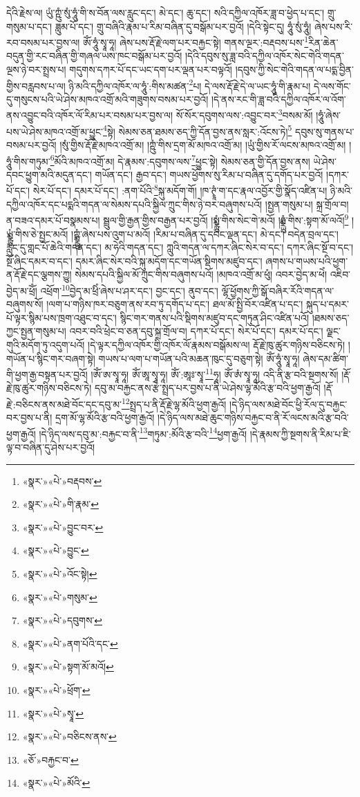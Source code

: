 དེའི་རྗེས་ལ། ཡུཾ་ཀྵུཾ་སུཾ་ཧཱུཾ་གི་ས་བོན་ལས་རླུང་དང་། མེ་དང་། ཆུ་དང་། སའི་དཀྱིལ་འཁོར་ཟླ་བ་ཕྱེད་པ་དང་། གྲུ་གསུམ་པ་དང་། ཟླུམ་པོ་དང་། གྲུ་བཞིའི་རྣམ་པ་རིམ་བཞིན་དུ་བསྒོམ་པར་བྱའོ། །དེའི་སྟེང་དུ། ཧཱུཾ་སུཾ་ཧཱུཾ། ཞེས་པས་རི་རབ་བསམ་པར་བྱས་ལ། ཨོཾ་ཧཱུཾ་སྭཱ་ཧཱ། ཞེས་པས་རྡོ་རྗེ་ལག་པར་བརྐྱང་སྟེ། གནས་ལྔར་:བརྡབས་པས་\footnote{«སྣར་»«པེ་»བརྡབས་}རིན་ཆེན་བདུན་གྱི་རང་བཞིན་གྱི་གཞལ་ཡས་ཁང་བསྒོམ་པར་བྱའོ། །དེའི་དབུས་སུ་ཟླ་བའི་དཀྱིལ་འཁོར་སེང་གེའི་གདན་ལྔས་ཉེ་བར་སྤྲས་པ། གདུགས་དཀར་པོ་དང་ཡང་དག་པར་ལྡན་པར་བལྟའོ། །དབུས་ཀྱི་སེང་གེའི་གདན་ལ་པདྨ་བྱིན་གྱིས་བརླབས་པ་ལ། ཉི་མའི་དཀྱིལ་འཁོར་ལ་ཧཱུཾ་:གིས་མཚན་\footnote{«སྣར་»«པེ་»གི་རྣམ་}པ། དེ་ལས་རྡོ་རྗེ་དེ་ལ་ཡང་ཧཱུཾ་གི་རྣམ་པ། དེ་ལས་གོང་དུ་གསུངས་པའི་ཡེ་ཤེས་མཁའ་འགྲོ་མའི་གཟུགས་བསམ་པར་བྱའོ། །དེ་ནས་རང་གི་ཟླ་བའི་དཀྱིལ་འཁོར་ལ་འོག་ནས་འབྱུང་བའི་འཁོར་ལོ་རིམ་པར་བསམ་པར་བྱས་ལ། སོ་སོར་དབུགས་ལས་:འབྱུང་བར་\footnote{«སྣར་»«པེ་»བྱུང་བར་}བསམ་མོ། །ཧཱུཾ་ཞེས་པས་ཡེ་ཤེས་མཁའ་འགྲོ་མ་ཕྱུང་\footnote{«སྣར་»«པེ་»བྱུང་}སྟེ། སེམས་ཅན་ཐམས་ཅད་ཀྱི་དོན་བྱས་ནས་སླར་:འོངས་ཏེ།\footnote{«སྣར་»«པེ་»འོང་སྟེ།} དབུས་སུ་གནས་པ་བསམ་པར་བྱའོ། །སུཾ་གྱིས་རྡོ་རྗེ་མཁའ་འགྲོ་མ། །ཀྵུཾ་གིས་དྲག་མོ་མཁའ་འགྲོ་མ། །ཡུཾ་གྱིས་རོ་ལངས་མཁའ་འགྲོ་མ། །ཧཱུཾ་གིས་གཏུམ་\footnote{«སྣར་»«པེ་»གསུམ་}མོའི་མཁའ་འགྲོ་མ། དེ་རྣམས་:དབུགས་ལས་\footnote{«སྣར་»«པེ་»དབུགས་}ཕྱུང་སྟེ། སེམས་ཅན་གྱི་དོན་བྱས་ནས། ཡེ་ཤེས་དབང་ཕྱུག་མའི་མདུན་དང་། གཡོན་དང་། རྒྱབ་དང་། གཡས་ཕྱོགས་སུ་རིམ་པ་བཞིན་དུ་དགོད་པར་བྱའོ། །དཀར་པོ་དང་། སེར་པོ་དང་། དམར་པོ་དང་། :ནག་པོའི་\footnote{«སྣར་»«པེ་»ནག་པོའི་དང་}སྐུ་མདོག་གོ། །ཁ་ཊྭཱཾ་ག་དང་རྣལ་འབྱོར་གྱི་སྣོད་འཛིན་པ། ཉི་མའི་དཀྱིལ་འཁོར་དང་པདྨའི་གདན་ལ་སེམས་དཔའི་སྐྱིལ་ཀྲུང་གིས་ཉེ་བར་བཞུགས་པའོ། །སྤྱན་གསུམ་པ། སྐྲ་གྲོལ་བ། ན་བཟའ་དམར་པོ་བསྣམས་པ། སྦྲུལ་གྱི་རྒྱན་གྱིས་བརྒྱན་པར་བྱའོ། །སྨྼྻུཾ་གིས་སེང་གེ་མའོ། །ཧྨྼྻུཾ་གིས་:སྟག་མོ་ལའོ།\footnote{«སྣར་»«པེ་»སྟག་མོ་མའོ།} །ཡྨྼྻུཾ་གིས་ཅེ་སྤྱང་མའོ། །ཀྵྨྼྻུཾ་ཞེས་པས་འུག་པ་མའོ། །རིམ་པ་བཞིན་དུ་དབང་ལྡན་དང་། མེ་དང་། བདེན་བྲལ་དང་། རླུང་དུ་གླང་པོ་ཆེའི་གདན་དང་། མ་ཧེའི་གདན་དང་། ཀླུའི་གདན་ལ་དཀར་ཞིང་སེར་བ་དང་། དཀར་ཞིང་སྔོ་བ་དང་། སྔོ་ཞིང་དམར་བ་དང་། དམར་ཞིང་སེར་བའི་སྐུ་མདོག་དང་གཡོན་སྡིགས་མཛུབ་དང་། ཞགས་པ་གཡས་པའི་ཕྱག་ན་རྡོ་རྗེ་དང་ལྕགས་ཀྱུ། སེམས་དཔའི་སྐྱིལ་མོ་ཀྲུང་གིས་བཞུགས་པའོ། །མཁའ་འགྲོ་མ་ཕུཾ། འབར་བྱེད་མ་ཕེཾ། འཇིབ་བྱེད་མ་ཕྲོཾ། འཕྲོག་\footnote{«སྣར་»«པེ་»ཕྲོག་}བྱེད་མ་ཕྲིཾ་ཞེས་པ་ཤར་དང་། བྱང་དང་། ནུབ་དང་། ལྷོ་ཕྱོགས་ཀྱི་སྒོ་བཞིར་རོའི་གདན་ལ་བཞུགས་སོ། །ལག་པ་གཉིས་ཁར་བཅུག་ནས་རབ་ཏུ་དགོད་པ་དང་། ཐལ་མོ་སྤྱི་བོར་འཛིན་པ་དང་། སྐུད་པ་དམར་པོ་ལྟར་སྙིམ་པས་ཁྲག་འཐུང་བ་དང་། སྙིང་གར་གནས་པའི་སྡིགས་མཛུབ་དང་གཏུན་ཤིང་འཛིན་པའོ། །ཐམས་ཅད་ཀྱང་སྤྱན་གསུམ་པ། འབར་བའི་ཕྲེང་བ་ཅན་དབུ་སྐྲ་གྲོལ་བ། དཀར་པོ་དང་། སེར་པོ་དང་། དམར་པོ་དང་། ལྗང་གུའི་མདོག་ཏུ་འདུག་པའོ། །དེ་ལྟར་དཀྱིལ་འཁོར་གྱི་འཁོར་ལོ་རྣམས་བསྒོམས་ལ། རྡོ་རྗེ་ཁུ་ཚུར་གཉིས་བཅིངས་ཏེ། །གཡོན་པ་སྙིང་གར་བཞག་སྟེ། གཡས་པ་ལག་པ་གཡོན་པའི་མཆན་ཁུང་དུ་བཅུག་སྟེ། ཨོཾ་ཧཱུཾ་སྭཱ་ཧཱ། ཞེས་དམ་ཚིག་གི་ཕྱག་རྒྱ་བསྟན་པར་བྱའོ། །ཨོཾ་ཨ་སྭཱ་ཧཱ། ཨོཾ་ཨཱ་སྭཱ་ཧཱ། ཨོཾ་:ཨཱཿ་སྭཱ་\footnote{«སྣར་»«པེ་»སྭཱ་}ཧཱ། ཨོཾ་ཨཾ་སྭཱ་ཧཱ། འདི་ནི་རྩ་བའི་སྔགས་སོ། །རྡོ་རྗེ་ཁུ་ཚུར་གཉིས་བཅིངས་ཏེ། དབུ་མ་བརྐྱང་ནས་རྩེ་སྤྲད་པར་བྱས་པ་ནི་ཡེ་ཤེས་ལྷ་མོའི་རྩ་བའི་ཕྱག་རྒྱའོ། །རྡོ་རྗེ་:བཅིངས་ནས་མཐེ་བོང་དང་དབུ་མ་\footnote{«སྣར་»«པེ་»བཅིངས་ནས་}སྤྲད་པ་ནི་རྡོ་རྗེ་ལྷ་མོའི་ཕྱག་རྒྱའོ། །དེ་ཉིད་ལས་མཐེ་བོང་ཕྱི་རོལ་དུ་བརྐྱང་བར་བྱས་པ་ནི། དྲག་མོ་ལྷ་མོའི་རྩ་བའི་ཕྱག་རྒྱའོ། །དེ་ཉིད་ལས་མཐེ་ཆུང་གཉིས་བརྐྱང་བ་ནི་རོ་ལངས་མའི་རྩ་བའི་ཕྱག་རྒྱའོ། །དེ་ཉིད་ལས་དབུ་མ་:བརྐྱང་བ་ནི་\footnote{«ཅོ་»བརྐྱང་བ་}གཏུམ་:མོའི་རྩ་བའི་\footnote{«སྣར་»«པེ་»མོའི་}ཕྱག་རྒྱའོ། །དེ་རྣམས་ཀྱི་སྔགས་ནི་རིམ་པ་ཇི་ལྟ་བ་བཞིན་དུ་ཤེས་པར་བྱའོ། 